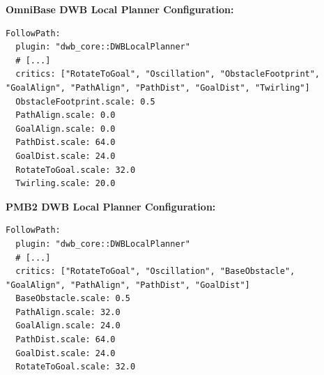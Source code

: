 \textbf{OmniBase DWB Local Planner Configuration:}
\begin{lstlisting}[style=myyaml]
FollowPath:
  plugin: "dwb_core::DWBLocalPlanner"
  # [...]
  critics: ["RotateToGoal", "Oscillation", "ObstacleFootprint", "GoalAlign", "PathAlign", "PathDist", "GoalDist", "Twirling"]
  ObstacleFootprint.scale: 0.5
  PathAlign.scale: 0.0
  GoalAlign.scale: 0.0
  PathDist.scale: 64.0
  GoalDist.scale: 24.0
  RotateToGoal.scale: 32.0
  Twirling.scale: 20.0
\end{lstlisting}

\clearpage
\vspace{0.3cm}
\noindent
\textbf{PMB2 DWB Local Planner Configuration:}
\begin{lstlisting}[style=myyaml]
FollowPath:
  plugin: "dwb_core::DWBLocalPlanner"
  # [...]
  critics: ["RotateToGoal", "Oscillation", "BaseObstacle", "GoalAlign", "PathAlign", "PathDist", "GoalDist"]
  BaseObstacle.scale: 0.5
  PathAlign.scale: 32.0
  GoalAlign.scale: 24.0
  PathDist.scale: 64.0
  GoalDist.scale: 24.0
  RotateToGoal.scale: 32.0
\end{lstlisting}
